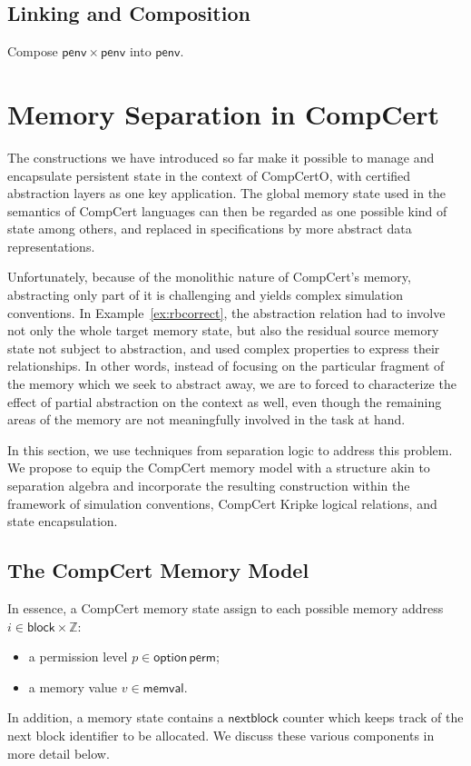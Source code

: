 \documentclass[acmsmall,screen,review,anonymous]{acmart}
\newcommand{\kw}[1]{\ensuremath{ \mathsf{#1} }}
\begin{document}

\subsection{Linking and Composition} %

Compose $\kw{penv} \times \kw{penv}$ into $\kw{penv}$.


\section{Memory Separation in CompCert} \label{sec:sep} %

The constructions we have introduced so far
make it possible to manage and encapsulate persistent state
in the context of CompCertO,
with certified abstraction layers
as one key application.
The global memory state used in the semantics of CompCert languages
can then be regarded as one possible kind of state among others,
and replaced in specifications by more abstract data representations.

Unfortunately,
because of the monolithic nature of CompCert's memory,
abstracting only part of it is challenging
and yields complex simulation conventions.
In Example~\ref{ex:rbcorrect},
the abstraction relation had to involve
not only the whole target memory state,
but also the residual source memory state
not subject to abstraction,
and used complex properties to express their relationships.
In other words,
instead of focusing on the particular fragment of the memory
which we seek to abstract away,
we are to forced to characterize the effect of partial abstraction
on the context as well,
even though the remaining areas of the memory
are not meaningfully involved in the task at hand.

In this section,
we use techniques from separation logic
to address this problem.
We propose to equip the CompCert memory model
with a structure akin to separation algebra \cite{something-for-sa}
and incorporate the resulting construction
within the framework of simulation conventions,
CompCert Kripke logical relations,
and state encapsulation.

\subsection{The CompCert Memory Model}

In essence,
a CompCert memory state
assign to each possible memory address $i \in \kw{block} \times \mathbb{Z}$:
\begin{itemize}
  \item a permission level $p \in \kw{option}\,\kw{perm}$;
  \item a memory value $v \in \kw{memval}$.
\end{itemize}
In addition,
a memory state contains a $\kw{nextblock}$ counter
which keeps track of the next block identifier to be allocated.
We discuss these various components in more detail below.
\end{document}

